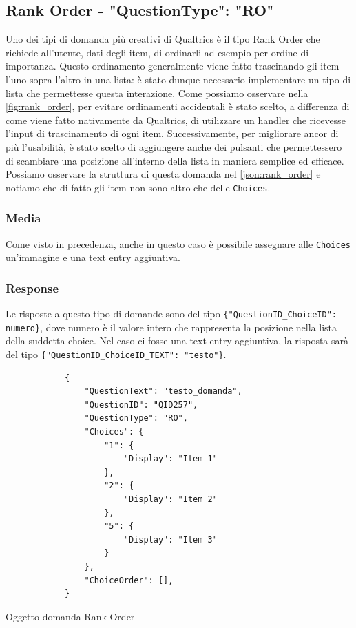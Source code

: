 \subsection{Rank Order - "QuestionType": "RO"}
Uno dei tipi di domanda più creativi di Qualtrics è il tipo Rank Order che richiede all'utente, dati degli item, di ordinarli ad esempio per ordine di importanza. Questo ordinamento generalmente viene fatto trascinando gli item l'uno sopra l'altro in una lista: è stato dunque necessario implementare un tipo di lista che permettesse questa interazione. Come possiamo osservare nella \autoref{fig:rank_order}, per evitare ordinamenti accidentali è stato scelto, a differenza di come viene fatto nativamente da Qualtrics, di utilizzare un handler che ricevesse l'input di trascinamento di ogni item. Successivamente, per migliorare ancor di più l'usabilità, è stato scelto di aggiungere anche dei pulsanti che permettessero di scambiare una posizione all'interno della lista in maniera semplice ed efficace. Possiamo osservare la struttura di questa domanda nel \autoref{json:rank_order} e notiamo che di fatto gli item non sono altro che delle \texttt{Choices}.

\subsubsection{Media}
Come visto in precedenza, anche in questo caso è possibile assegnare alle \texttt{Choices} un'immagine e una text entry aggiuntiva.

\subsubsection{Response}
Le risposte a questo tipo di domande sono del tipo \texttt{\{"QuestionID\_ChoiceID": numero\}}, dove numero è il valore intero che rappresenta la posizione nella lista della suddetta choice. Nel caso ci fosse una text entry aggiuntiva, la risposta sarà del tipo \texttt{\{"QuestionID\_ChoiceID\_TEXT": "testo"\}}.

\newpage
\begin{json}
\begin{verbatim}
            {
                "QuestionText": "testo_domanda",
                "QuestionID": "QID257",
                "QuestionType": "RO",
                "Choices": {
                    "1": {
                        "Display": "Item 1"
                    },
                    "2": {
                        "Display": "Item 2"
                    },
                    "5": {
                        "Display": "Item 3"
                    }
                },
                "ChoiceOrder": [],
            }
\end{verbatim}
\caption{Oggetto domanda Rank Order}
\label{json:rank_order}
\end{json}

